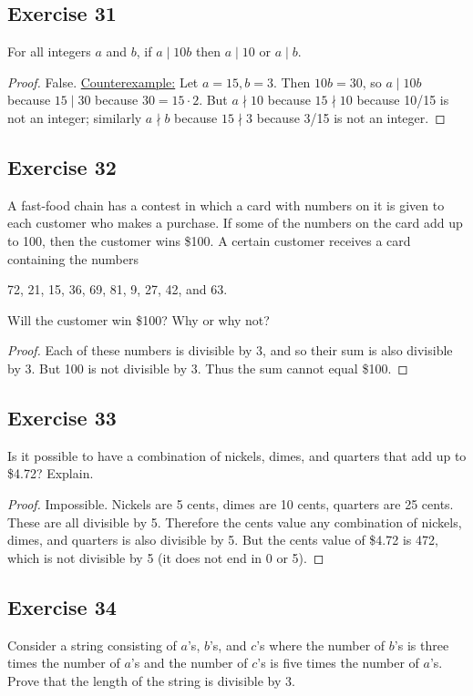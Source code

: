 \documentclass[14pt]{extarticle}
\begin{document}
\subsection{Exercise 31}
For all integers $a$ and $b$, if $a\mid 10b$ then $a\mid 10$ or $a\mid b$.

\begin{proof}
    False. \underline{Counterexample:} Let $a = 15, b = 3$. Then $10b = 30$, so $a \mid 10b$ because $15 \mid 30$ because $30 = 15 \cdot 2$. But $a \nmid 10$ because $15 \nmid 10$ because 10/15 is not an integer; similarly $a \nmid b$ because $15 \nmid 3$ because 3/15 is not an integer.
\end{proof}

\subsection{Exercise 32}
A fast-food chain has a contest in which a card with numbers on it is given to each customer who makes a purchase. If some of the numbers on the card add up to 100, then the customer wins \$100. A certain customer receives a card containing the numbers
\begin{center}
    72, 21, 15, 36, 69, 81, 9, 27, 42, and 63.
\end{center}
Will the customer win \$100? Why or why not?

\begin{proof}
    Each of these numbers is divisible by 3, and so their sum is also divisible by 3. But 100 is not divisible by 3. Thus the sum cannot equal \$100.
\end{proof}

\subsection{Exercise 33}
Is it possible to have a combination of nickels, dimes, and quarters that add up to \$4.72? Explain.

\begin{proof}
    Impossible. Nickels are 5 cents, dimes are 10 cents, quarters are 25 cents. These are all divisible by 5. Therefore the cents value any combination of nickels, dimes, and quarters is also divisible by 5. But the cents value of \$4.72 is 472, which is not divisible by 5 (it does not end in 0 or 5).
\end{proof}

\subsection{Exercise 34}
Consider a string consisting of $a$’s, $b$’s, and $c$’s where the number of $b$’s is three times the number of $a$’s and the number of $c$’s is five times the number of $a$’s. Prove that the length of the string is divisible by 3.
\end{document}
